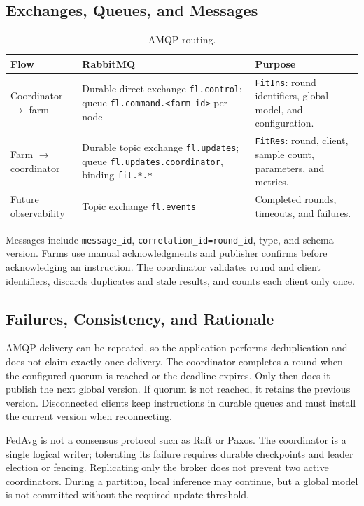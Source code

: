 ﻿\documentclass[11pt,a4paper]{article}
\begin{document}
\subsection{Exchanges, Queues, and Messages}\begin{table}[H]\small\centering\begin{tabularx}{\textwidth}{p{3cm}p{4cm}Y}\toprule
Flow & RabbitMQ & Purpose \\\midrule
Coordinator $\to$ farm & Durable direct exchange \texttt{fl.control}; queue \texttt{fl.command.<farm-id>} per node & \texttt{FitIns}: round identifiers, global model, and configuration. \\
Farm $\to$ coordinator & Durable topic exchange \texttt{fl.updates}; queue \texttt{fl.updates.coordinator}, binding \texttt{fit.*.*} & \texttt{FitRes}: round, client, sample count, parameters, and metrics. \\
Future observability & Topic exchange \texttt{fl.events} & Completed rounds, timeouts, and failures. \\
\bottomrule\end{tabularx}\caption{AMQP routing.}\end{table}
Messages include \texttt{message\_id}, \texttt{correlation\_id=round\_id}, type, and schema version. Farms use manual acknowledgments and publisher confirms before acknowledging an instruction. The coordinator validates round and client identifiers, discards duplicates and stale results, and counts each client only once.
\subsection{Failures, Consistency, and Rationale}AMQP delivery can be repeated, so the application performs deduplication and does not claim exactly-once delivery. The coordinator completes a round when the configured quorum is reached or the deadline expires. Only then does it publish the next global version. If quorum is not reached, it retains the previous version. Disconnected clients keep instructions in durable queues and must install the current version when reconnecting.

FedAvg is not a consensus protocol such as Raft or Paxos. The coordinator is a single logical writer; tolerating its failure requires durable checkpoints and leader election or fencing. Replicating only the broker does not prevent two active coordinators. During a partition, local inference may continue, but a global model is not committed without the required update threshold.
\end{document}
